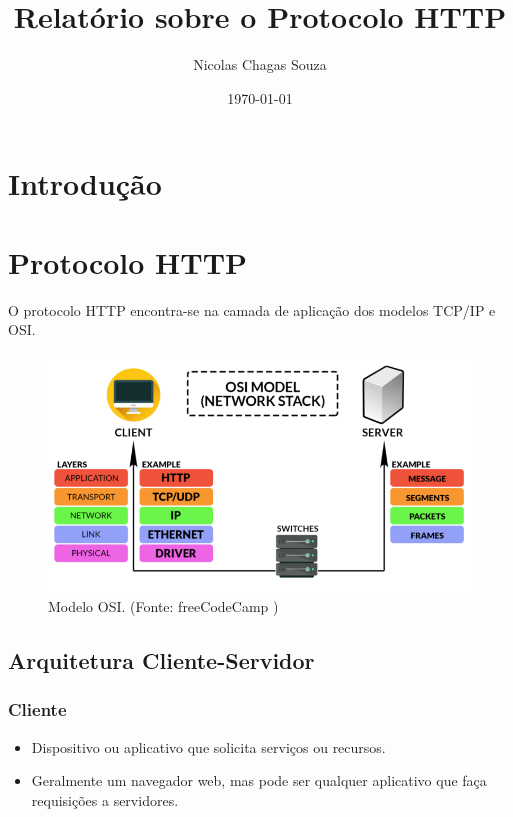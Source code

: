 \documentclass{article}
\title{Relatório sobre o Protocolo HTTP}
\author{Nicolas Chagas Souza}
\date{\today}
\begin{document}
\maketitle

\section{Introdução}

\section{Protocolo HTTP}

O protocolo HTTP encontra-se na camada de aplicação dos modelos TCP/IP e OSI.

\begin{figure}[H]
    \centering
    \includegraphics[width=\textwidth]{./assets/osi.png}
    \caption{Modelo OSI. (Fonte: freeCodeCamp \cite{freecodecamp})}
\end{figure}

\subsection{Arquitetura Cliente-Servidor}

\subsubsection{Cliente}

\begin{itemize}
    \item Dispositivo ou aplicativo que solicita serviços ou recursos.
    \item Geralmente um navegador web, mas pode ser qualquer aplicativo que faça
          requisições a servidores.
\end{itemize}
\end{document}
